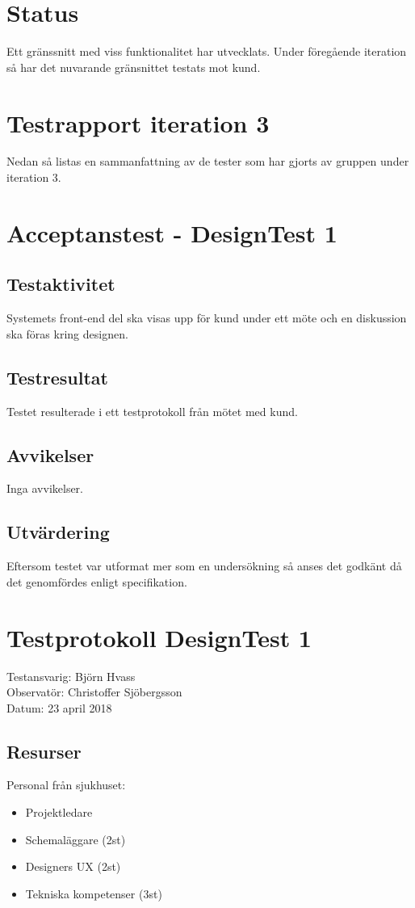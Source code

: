 \documentclass[a4paper,10pt, twoside]{article}
\begin{document}


\newpage
\section{Status}
Ett gränssnitt med viss funktionalitet har utvecklats. Under föregående iteration så har det nuvarande gränsnittet testats mot kund.  

\section{Testrapport iteration 3}
Nedan så listas en sammanfattning av de tester som har gjorts av gruppen under iteration 3.  

\section{Acceptanstest - DesignTest 1}
\subsection{Testaktivitet}
    Systemets front-end del ska visas upp för kund under ett möte och en diskussion ska föras kring designen.
\subsection{Testresultat}
    Testet resulterade i ett testprotokoll från mötet med kund.

\subsection{Avvikelser}
    Inga avvikelser.
\subsection{Utvärdering}
    Eftersom testet var utformat mer som en undersökning så anses det godkänt då det genomfördes enligt specifikation.

\clearpage
\appendix
\section{Testprotokoll DesignTest 1}
	Testansvarig: Björn Hvass\\Observatör: Christoffer Sjöbergsson\\Datum: 23 april 2018

\subsection{Resurser}
    Personal från sjukhuset:
    \begin{itemize}
        \item Projektledare
        \item Schemaläggare (2st)
        \item Designers UX (2st)
        \item Tekniska kompetenser (3st)
    \end{itemize}
\end{document}
